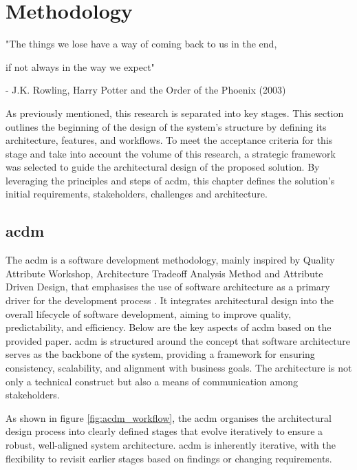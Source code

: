 \chapter{Methodology}
\label{chapter:methodology}

\begin{introduction}
"The things we lose have a way of coming back to us in the end,

if not always in the way we expect"

- J.K. Rowling, Harry Potter and the Order of the Phoenix (2003)
\end{introduction}

As previously mentioned, this research is separated into key stages. This section outlines the beginning of the design of the system's structure by defining its architecture, features, and workflows. To meet the acceptance criteria for this stage and take into account the volume of this research, a strategic framework was selected to guide the architectural design of the proposed solution. By leveraging the principles and steps of \ac{acdm}, this chapter defines the solution's initial requirements, stakeholders, challenges and architecture.

\section{\acl{acdm}} \label{section:acdm}

The \ac{acdm} is a software development methodology, mainly inspired by Quality Attribute Workshop, Architecture Tradeoff Analysis Method and Attribute Driven Design, that emphasises the use of software architecture as a primary driver for the development process \cite{Lattanze2005}. It integrates architectural design into the overall lifecycle of software development, aiming to improve quality, predictability, and efficiency. Below are the key aspects of \ac{acdm} based on the provided paper. \ac{acdm} is structured around the concept that software architecture serves as the backbone of the system, providing a framework for ensuring consistency, scalability, and alignment with business goals. The architecture is not only a technical construct but also a means of communication among stakeholders.

As shown in figure \ref{fig:acdm_workflow}, the \ac{acdm} organises the architectural design process into clearly defined stages that evolve iteratively to ensure a robust, well-aligned system architecture. \ac{acdm} is inherently iterative, with the flexibility to revisit earlier stages based on findings or changing requirements.

